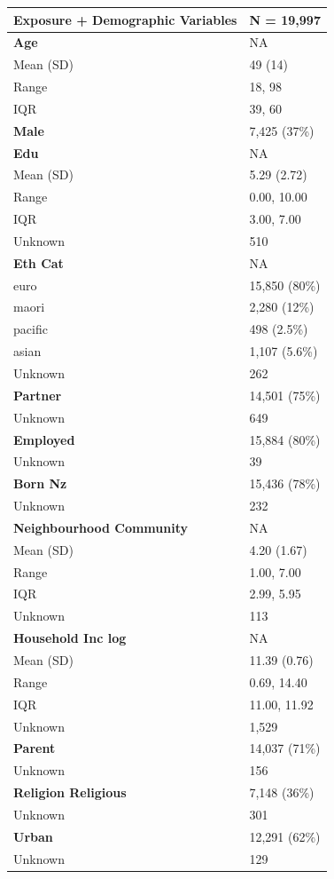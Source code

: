\documentclass[
  single column]{article}
\begin{document}
\begin{longtable}[]{@{}ll@{}}
\toprule\noalign{}
\textbf{Exposure + Demographic Variables} & \textbf{N = 19,997} \\
\midrule\noalign{}
\endhead
\bottomrule\noalign{}
\endlastfoot
\textbf{Age} & NA \\
Mean (SD) & 49 (14) \\
Range & 18, 98 \\
IQR & 39, 60 \\
\textbf{Male} & 7,425 (37\%) \\
\textbf{Edu} & NA \\
Mean (SD) & 5.29 (2.72) \\
Range & 0.00, 10.00 \\
IQR & 3.00, 7.00 \\
Unknown & 510 \\
\textbf{Eth Cat} & NA \\
euro & 15,850 (80\%) \\
maori & 2,280 (12\%) \\
pacific & 498 (2.5\%) \\
asian & 1,107 (5.6\%) \\
Unknown & 262 \\
\textbf{Partner} & 14,501 (75\%) \\
Unknown & 649 \\
\textbf{Employed} & 15,884 (80\%) \\
Unknown & 39 \\
\textbf{Born Nz} & 15,436 (78\%) \\
Unknown & 232 \\
\textbf{Neighbourhood Community} & NA \\
Mean (SD) & 4.20 (1.67) \\
Range & 1.00, 7.00 \\
IQR & 2.99, 5.95 \\
Unknown & 113 \\
\textbf{Household Inc log} & NA \\
Mean (SD) & 11.39 (0.76) \\
Range & 0.69, 14.40 \\
IQR & 11.00, 11.92 \\
Unknown & 1,529 \\
\textbf{Parent} & 14,037 (71\%) \\
Unknown & 156 \\
\textbf{Religion Religious} & 7,148 (36\%) \\
Unknown & 301 \\
\textbf{Urban} & 12,291 (62\%) \\
Unknown & 129 \\

\end{longtable}
\end{document}
